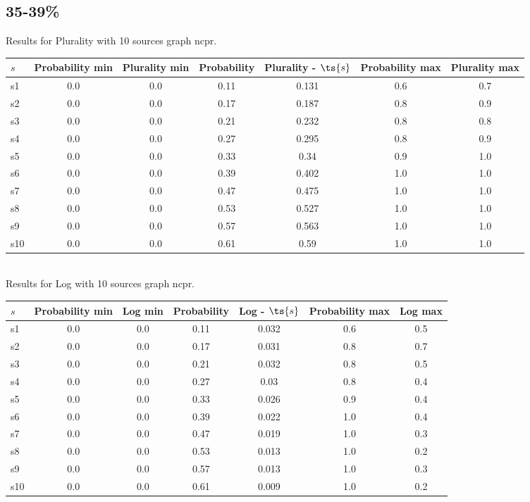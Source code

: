 \documentclass{article}
\begin{document}
\newpage

\subsection{35-39\%}

\noindent Results for Plurality with 10 sources graph ncpr.

\noindent\begin{tabular}{|l|c|c|c|c|c|c|}
\hline
$s$& Probability min & Plurality min & Probability & Plurality - $\ts{s}$ & Probability max & Plurality max\\
\hline
s1 &0.0 & 0.0 & 0.11 & 0.131 & 0.6 & 0.7\\
\hline
s2 &0.0 & 0.0 & 0.17 & 0.187 & 0.8 & 0.9\\
\hline
s3 &0.0 & 0.0 & 0.21 & 0.232 & 0.8 & 0.8\\
\hline
s4 &0.0 & 0.0 & 0.27 & 0.295 & 0.8 & 0.9\\
\hline
s5 &0.0 & 0.0 & 0.33 & 0.34 & 0.9 & 1.0\\
\hline
s6 &0.0 & 0.0 & 0.39 & 0.402 & 1.0 & 1.0\\
\hline
s7 &0.0 & 0.0 & 0.47 & 0.475 & 1.0 & 1.0\\
\hline
s8 &0.0 & 0.0 & 0.53 & 0.527 & 1.0 & 1.0\\
\hline
s9 &0.0 & 0.0 & 0.57 & 0.563 & 1.0 & 1.0\\
\hline
s10 &0.0 & 0.0 & 0.61 & 0.59 & 1.0 & 1.0\\
\hline
\end{tabular}\\

\noindent Results for Log with 10 sources graph ncpr.

\noindent\begin{tabular}{|l|c|c|c|c|c|c|}
\hline
$s$& Probability min & Log min & Probability & Log - $\ts{s}$ & Probability max & Log max\\
\hline
s1 &0.0 & 0.0 & 0.11 & 0.032 & 0.6 & 0.5\\
\hline
s2 &0.0 & 0.0 & 0.17 & 0.031 & 0.8 & 0.7\\
\hline
s3 &0.0 & 0.0 & 0.21 & 0.032 & 0.8 & 0.5\\
\hline
s4 &0.0 & 0.0 & 0.27 & 0.03 & 0.8 & 0.4\\
\hline
s5 &0.0 & 0.0 & 0.33 & 0.026 & 0.9 & 0.4\\
\hline
s6 &0.0 & 0.0 & 0.39 & 0.022 & 1.0 & 0.4\\
\hline
s7 &0.0 & 0.0 & 0.47 & 0.019 & 1.0 & 0.3\\
\hline
s8 &0.0 & 0.0 & 0.53 & 0.013 & 1.0 & 0.2\\
\hline
s9 &0.0 & 0.0 & 0.57 & 0.013 & 1.0 & 0.3\\
\hline
s10 &0.0 & 0.0 & 0.61 & 0.009 & 1.0 & 0.2\\
\hline
\end{tabular}\\
\end{document}
